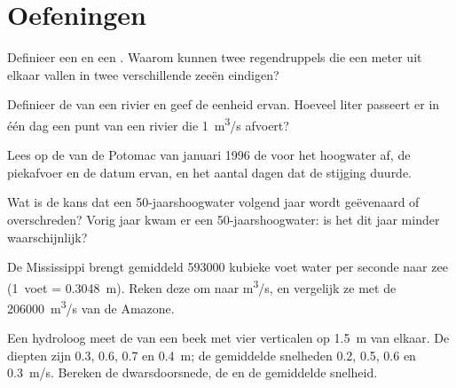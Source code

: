 \section{Oefeningen}

\begin{exercise}[$\star$]\label{exo:g10:drainage-basins:1}
Definieer een  en een . Waarom kunnen twee
regendruppels die een meter uit elkaar vallen in twee verschillende zeeën eindigen?
\end{exercise}

\begin{exercise}[$\star$]\label{exo:g10:drainage-basins:2}
Definieer de  van een rivier en geef de eenheid ervan. Hoeveel liter
passeert er in één dag een punt van een rivier die \qty{1}{m^3/s} afvoert?
\end{exercise}

\begin{exercise}[$\star$]\label{exo:g10:drainage-basins:3}
Lees op de  van de Potomac van januari 1996 de  voor het
hoogwater af, de piekafvoer en de datum ervan, en het aantal dagen dat de
stijging duurde.
\end{exercise}

\begin{exercise}[$\star$]\label{exo:g10:drainage-basins:4}
Wat is de kans dat een \num{50}-jaarshoogwater volgend jaar wordt geëvenaard of
overschreden? Vorig jaar kwam er een \num{50}-jaarshoogwater: is het dit jaar
minder waarschijnlijk?
\end{exercise}

\begin{exercise}[$\star$]\label{exo:g10:drainage-basins:5}
De Mississippi brengt gemiddeld \num{593000} kubieke voet water per seconde naar
zee (\num{1}~voet = \qty{0.3048}{m}). Reken deze  om naar \unit{m^3/s},
en vergelijk ze met de \qty{206000}{m^3/s} van de
Amazone.
\end{exercise}

\begin{exercise}[$\star\star$]\label{exo:g10:drainage-basins:6}
Een hydroloog meet de  van een beek met vier verticalen op \qty{1.5}{m}
van elkaar. De diepten zijn \num{0.3}, \num{0.6}, \num{0.7} en \qty{0.4}{m}; de
gemiddelde snelheden \num{0.2}, \num{0.5}, \num{0.6} en \qty{0.3}{m/s}. Bereken
de dwarsdoorsnede, de  en de gemiddelde snelheid.
\end{exercise}


